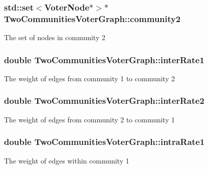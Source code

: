 \subsubsection[{community2}]{\setlength{\rightskip}{0pt plus 5cm}std\+::set$<${\bf Voter\+Node}$\ast$$>$$\ast$ Two\+Communities\+Voter\+Graph\+::community2}\label{class_two_communities_voter_graph_a7c918c6733474caa86bc2d217bd2cb4d}
The set of nodes in community 2 \hypertarget{class_two_communities_voter_graph_af08c3b9a6e6f1dc8659a38ecd2d1afde}{}
\subsubsection[{inter\+Rate1}]{\setlength{\rightskip}{0pt plus 5cm}double Two\+Communities\+Voter\+Graph\+::inter\+Rate1}\label{class_two_communities_voter_graph_af08c3b9a6e6f1dc8659a38ecd2d1afde}
The weight of edges from community 1 to community 2 \hypertarget{class_two_communities_voter_graph_afab8bb5994f7fd1370d7d81caf7277d4}{}
\subsubsection[{inter\+Rate2}]{\setlength{\rightskip}{0pt plus 5cm}double Two\+Communities\+Voter\+Graph\+::inter\+Rate2}\label{class_two_communities_voter_graph_afab8bb5994f7fd1370d7d81caf7277d4}
The weight of edges from community 2 to community 1 \hypertarget{class_two_communities_voter_graph_a96a32ba7529177a7f6b73e827a57791e}{}
\subsubsection[{intra\+Rate1}]{\setlength{\rightskip}{0pt plus 5cm}double Two\+Communities\+Voter\+Graph\+::intra\+Rate1}\label{class_two_communities_voter_graph_a96a32ba7529177a7f6b73e827a57791e}
The weight of edges within community 1 \hypertarget{class_two_communities_voter_graph_a6e7ea06e014d75b7bf18441885e07e1e}{}
